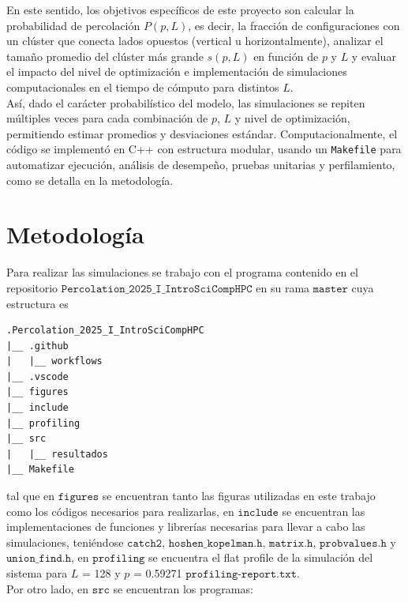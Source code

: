 \documentclass[12pt,a4paper]{article}
\begin{document}
En este sentido, los objetivos específicos de este proyecto son calcular la probabilidad de percolación \( P(p, L) \), es decir, la fracción de configuraciones con un clúster que conecta lados opuestos (vertical u horizontalmente), analizar el tamaño promedio del clúster más grande \( s(p, L) \) en función de \( p \) y \( L \) y evaluar el impacto del nivel de optimización e implementación de simulaciones computacionales en el tiempo de cómputo para distintos \( L \).
\\

Así, dado el carácter probabilístico del modelo, las simulaciones se repiten múltiples veces para cada combinación de \( p \), \( L \) y nivel de optimización, permitiendo estimar promedios y desviaciones estándar. Computacionalmente, el código se implementó en C++ con estructura modular, usando un \texttt{Makefile} para automatizar ejecución, análisis de desempeño, pruebas unitarias y perfilamiento, como se detalla en la metodología.


\section{Metodología}
Para realizar las simulaciones se trabajo con el programa contenido en el repositorio $\texttt{Percolation\_2025\_I\_IntroSciCompHPC}$ \cite{repo} en su rama $\texttt{master}$ cuya estructura es 

\begin{verbatim}
.Percolation_2025_I_IntroSciCompHPC
|__ .github
|   |__ workflows
|__ .vscode
|__ figures
|__ include
|__ profiling
|__ src
|   |__ resultados
|__ Makefile
\end{verbatim}

tal que en $\texttt{figures}$ se encuentran tanto las figuras utilizadas en este trabajo como los códigos necesarios para realizarlas, en $\texttt{include}$ se encuentran las implementaciones de funciones y librerías necesarias para llevar a cabo las simulaciones, teniéndose $\texttt{catch2}$, $\texttt{hoshen\_kopelman.h}$, $\texttt{matrix.h}$, $\texttt{probvalues.h}$ y $\texttt{union\_find.h}$, en $\texttt{profiling}$ se encuentra el flat profile de la simulación del sistema para $L$ = 128 y $p$ = 0.59271 $\texttt{profiling-report.txt}$.
\\

Por otro lado, en $\texttt{src}$ se encuentran los programas:
\end{document}
